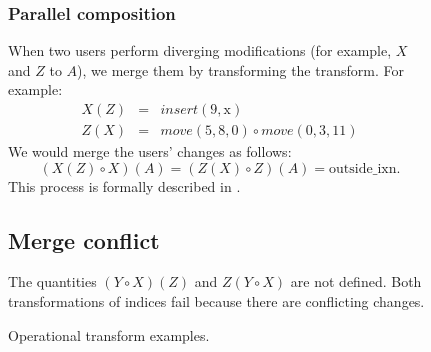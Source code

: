 \documentclass[11pt,titlepage]{article}
\begin{document}
\begin{figure}[h]
\begin{minipage}{\textwidth}
\begin{multicols}{2}
      \subsubsection*{Parallel composition}
      When two users perform diverging modifications (for example,
      \(X\) and \(Z\) to \(A\)), we merge them by transforming the
      transform.  For example:
      \begin{eqnarray*}
        X(Z) &=& insert(9, \mathrm{x}) \\
        Z(X) &=& move(5, 8, 0) \circ move(0, 3, 11)
      \end{eqnarray*}
      We would merge the users' changes as follows: \[(X(Z) \circ
      X)(A) = (Z(X) \circ Z)(A) = \mathrm{outside\_ixn}.\] This
      process is formally described in \cite{ot}.
      \subsection*{Merge conflict}
      The quantities \((Y \circ X)(Z)\) and \(Z(Y \circ X)\) are not
      defined.  Both transformations of indices fail because there are
      conflicting changes.
    \end{multicols}
  \end{minipage}
  \caption{Operational transform examples.}
  \label{fig:ot}
\end{figure}
\end{document}
